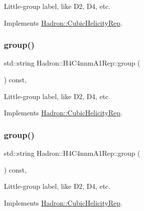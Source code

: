 Little-\/group label, like D2, D4, etc. 

Implements \mbox{\hyperlink{structHadron_1_1CubicHelicityRep_a101a7d76cd8ccdad0f272db44b766113}{Hadron\+::\+Cubic\+Helicity\+Rep}}.

\mbox{\label{structHadron_1_1H4C4nnmA1Rep_a6434db04654db0e72689cb23155ce5c7}} 
\subsubsection{\texorpdfstring{group()}{group()}\hspace{0.1cm}{\footnotesize\ttfamily [2/3]}}
{\footnotesize\ttfamily std\+::string Hadron\+::\+H4\+C4nnm\+A1\+Rep\+::group (\begin{DoxyParamCaption}{ }\end{DoxyParamCaption}) const\hspace{0.3cm}{\ttfamily [inline]}, {\ttfamily [virtual]}}

Little-\/group label, like D2, D4, etc. 

Implements \mbox{\hyperlink{structHadron_1_1CubicHelicityRep_a101a7d76cd8ccdad0f272db44b766113}{Hadron\+::\+Cubic\+Helicity\+Rep}}.

\mbox{\label{structHadron_1_1H4C4nnmA1Rep_a6434db04654db0e72689cb23155ce5c7}} 
\subsubsection{\texorpdfstring{group()}{group()}\hspace{0.1cm}{\footnotesize\ttfamily [3/3]}}
{\footnotesize\ttfamily std\+::string Hadron\+::\+H4\+C4nnm\+A1\+Rep\+::group (\begin{DoxyParamCaption}{ }\end{DoxyParamCaption}) const\hspace{0.3cm}{\ttfamily [inline]}, {\ttfamily [virtual]}}

Little-\/group label, like D2, D4, etc. 

Implements \mbox{\hyperlink{structHadron_1_1CubicHelicityRep_a101a7d76cd8ccdad0f272db44b766113}{Hadron\+::\+Cubic\+Helicity\+Rep}}.

